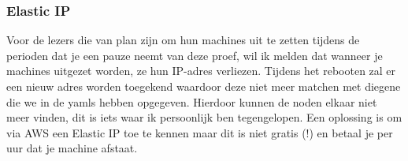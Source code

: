 \documentclass{article}
\begin{document}
	\subsubsection{Elastic IP}
	Voor de lezers die van plan zijn om hun machines uit te zetten tijdens de perioden dat je een pauze neemt van deze proef, wil ik melden dat wanneer je machines uitgezet worden, ze hun IP-adres verliezen. Tijdens het rebooten zal er een nieuw adres worden toegekend waardoor deze niet meer matchen met diegene die we in de yamls hebben opgegeven. Hierdoor kunnen de noden elkaar niet meer vinden, dit is iets waar ik persoonlijk ben tegengelopen. Een oplossing is om via AWS een Elastic IP toe te kennen maar dit is niet gratis (!) en betaal je per uur dat je machine afstaat.
\end{document}
